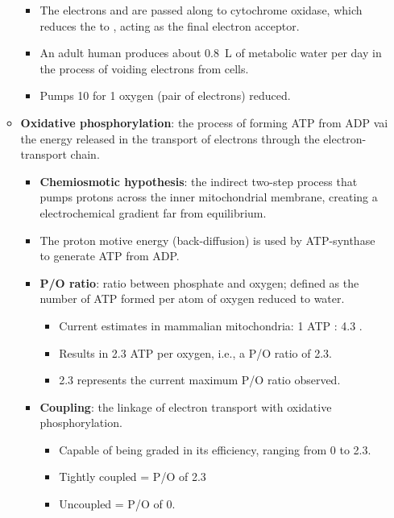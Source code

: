 \documentclass[12pt,a4paper]{article}
\begin{document}
\begin{itemize}
\begin{itemize}
\begin{itemize}
                \item The electrons and are passed along to cytochrome oxidase, which reduces the  to , acting as the {\color{o-Sun}final electron acceptor}.
                \item An adult human produces about \SI{0.8}{L} of metabolic water per day in the process of voiding electrons from cells.
                \item Pumps {\color{o-Sun}10 } for {\color{o-Sun}1 oxygen} (pair of electrons) reduced.
            \end{itemize}
        \item \textbf{Oxidative phosphorylation}: the process of forming ATP from ADP vai the energy released in the transport of electrons through the electron-transport chain.
            \begin{itemize}
                \item \textbf{Chemiosmotic hypothesis}: the indirect two-step process that pumps protons across the inner mitochondrial membrane, creating a electrochemical gradient far from equilibrium.
                \item The proton motive energy (back-diffusion) is used by ATP-synthase to generate ATP from ADP.
                \item \textbf{P/O ratio}: ratio between phosphate and oxygen; defined as the number of ATP formed per atom of oxygen reduced to water.
                    \begin{itemize}
                        \item Current estimates in mammalian mitochondria: 1 ATP : 4.3 {\color{pos}}.
                        \item Results in 2.3 ATP per oxygen, i.e., a {\color{o-Sun}P/O ratio of 2.3}.                    
                        \item 2.3 represents the current maximum P/O ratio observed.
                    \end{itemize}
                \item \textbf{Coupling}: the linkage of electron transport with oxidative phosphorylation.
                    \begin{itemize}
                        \item Capable of being graded in its efficiency, ranging from 0 to 2.3.
                        \item Tightly coupled = P/O of 2.3
                        \item Uncoupled = P/O of 0.

\end{itemize}
\end{itemize}
\end{itemize}
\end{itemize}
\end{document}

